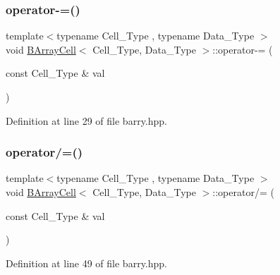 \mbox{\label{classbarry_1_1_b_array_cell_a2f2d39b5e9dfe7d0ef62a42445c85439}} 
\subsubsection{\texorpdfstring{operator-\/=()}{operator-=()}}
{\footnotesize\ttfamily template$<$typename Cell\+\_\+\+Type , typename Data\+\_\+\+Type $>$ \\
void \hyperlink{classbarry_1_1_b_array_cell}{B\+Array\+Cell}$<$ Cell\+\_\+\+Type, Data\+\_\+\+Type $>$\+::operator-\/= (\begin{DoxyParamCaption}\item[{const Cell\+\_\+\+Type \&}]{val }\end{DoxyParamCaption})\hspace{0.3cm}{\ttfamily [inline]}}



Definition at line 29 of file barry.\+hpp.

\mbox{\label{classbarry_1_1_b_array_cell_aa5debb920d8ffc246e7d463ac8e26152}} 
\subsubsection{\texorpdfstring{operator/=()}{operator/=()}}
{\footnotesize\ttfamily template$<$typename Cell\+\_\+\+Type , typename Data\+\_\+\+Type $>$ \\
void \hyperlink{classbarry_1_1_b_array_cell}{B\+Array\+Cell}$<$ Cell\+\_\+\+Type, Data\+\_\+\+Type $>$\+::operator/= (\begin{DoxyParamCaption}\item[{const Cell\+\_\+\+Type \&}]{val }\end{DoxyParamCaption})\hspace{0.3cm}{\ttfamily [inline]}}



Definition at line 49 of file barry.\+hpp.

\mbox{\label{classbarry_1_1_b_array_cell_ad20091ef5961aed4241bd8d0b6d5dd0d}} 
